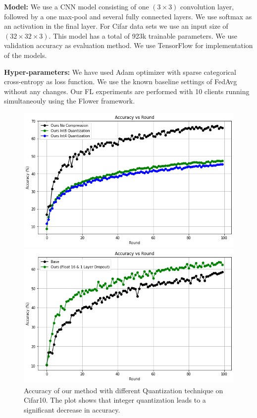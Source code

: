 \documentclass{article}
\begin{document}
\textbf{Model: }We use a CNN model consisting of one $(3 \times 3)$ convolution layer, followed by a one max-pool and several fully connected layers. We use softmax as an activation in the final layer. For Cifar data sets we use an input size of $(32 \times 32 \times 3)$. This model has a total of 923k trainable parameters. We use validation accuracy as evaluation method. We use TensorFlow for implementation of the models.

\textbf{Hyper-parameters: } We have used Adam optimizer with sparse categorical cross-entropy as loss function. We use the known baseline settings of FedAvg without any changes. Our FL experiments are performed with 10 clients running simultaneouly using the Flower framework.


\begin{figure}[ht]
  \centering
  \begin{minipage}{.45\textwidth}
    \centering
    \includegraphics[width=\linewidth, height=0.7\linewidth]{img/Acc_Cifar10_comp.png}
    \caption{Accuracy of our method with different Quantization technique on Cifar10. The plot shows that integer quantization leads to a significant decrease in accuracy.}
    \label{fig:qu_cifar}
  \end{minipage}\hfill %
  \begin{minipage}{.45\textwidth}
    \centering
    \includegraphics[width=\linewidth, height=0.7\linewidth]{img/Acc_Cifar10_Imb.png}

\end{minipage}
\end{figure}
\end{document}
